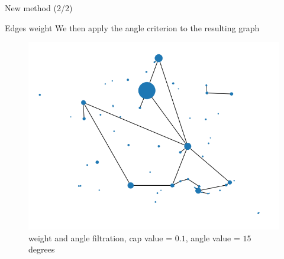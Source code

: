 \begin{frame}{New method (2/2)}
    \begin{block}{Edges weight}
        We then apply the angle criterion to the resulting graph
    \end{block}

    \begin{figure}
        \includegraphics[height=0.4\paperheight]{images/road_detection/edges_weight_angle_filtration.png}
        \caption{weight and angle filtration, cap value = $0.1$, angle value = $15$ degrees}
    \end{figure}
\end{frame} 